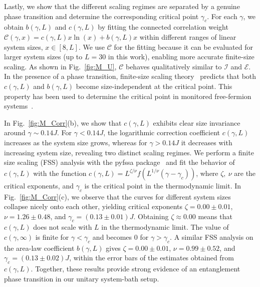 \documentclass[reprint, superscriptaddress, aps, prl]{revtex4-2}
\begin{document}
Lastly, we show that the different scaling regimes are separated by a genuine phase transition and determine the corresponding critical point $\gamma_c$.
For each $\gamma$, we obtain $b(\gamma, L)$ and $c(\gamma, L)$ by fitting the connected correlation weight $\mathcal{C}(\gamma, x) = c(\gamma, L) x \ln (x) + b(\gamma, L) x$ within different ranges of linear system sizes, $x \in [8, L]$.
We use $\mathcal{C}$ for the fitting because it can be evaluated for larger system sizes (up to $L = 30$ in this work), enabling more accurate finite-size scaling.
As shown in Fig.~\ref{fig:M_U}, $\mathcal{C}$ behaves qualitatively similar to $\mathcal{I}$ and $\mathcal{E}$.
In the presence of a phase transition, finite-size scaling theory~\cite{FisherBarber1972, CampostriniVicari2014} predicts that both $c(\gamma, L)$ and $b(\gamma, L)$ become size-independent at the critical point.
This property has been used to determine the critical point in monitored free-fermion systems~\cite{ChahineBuchhold2024, PoboikoMirlin2024, MuzziChriaco2025}.

In Fig.~\ref{fig:M_Corr}(b), we show that $c(\gamma, L)$ exhibits clear size invariance around $\gamma \sim 0.14J$.
For $\gamma < 0.14J$, the logarithmic correction coefficient $c(\gamma, L)$ increases as the system size grows, whereas for $\gamma > 0.14J$ it decreases with increasing system size, revealing two distinct scaling regimes.
We perform a finite size scaling (FSS) analysis with the pyfssa package~\cite{Melchert2009, Sorge2015} and fit the behavior of $c(\gamma, L)$ with the function $c(\gamma, L) = L^{\zeta/\nu} f\left(L^{1/\nu} (\gamma - \gamma_c)\right)$, where $\zeta,\ \nu$ are the critical exponents, and $\gamma_c$ is the critical point in the thermodynamic limit.
In Fig.~\ref{fig:M_Corr}(c), we observe that the curves for different system sizes collapse nicely onto each other, yielding critical exponents $\zeta = 0.00 \pm 0.01$, $\nu = 1.26 \pm 0.48$, and $\gamma_c = (0.13 \pm 0.01)J$.
Obtaining $\zeta \approx 0.00$ means that $c(\gamma, L)$ does not scale with $L$ in the thermodynamic limit.
The value of $c(\gamma, \infty)$ is finite for $\gamma < \gamma_c$ and becomes $0$ for $\gamma > \gamma_c$.
A similar FSS analysis on the area-law coefficient $b(\gamma, L)$ gives $\zeta = 0.00 \pm 0.01$, $\nu = 0.99 \pm 0.52$, and $\gamma_c = (0.13 \pm 0.02)J$, within the error bars of the estimates obtained from $c(\gamma, L)$.
Together, these results provide strong evidence of an entanglement phase transition in our unitary system-bath setup.
\end{document}
